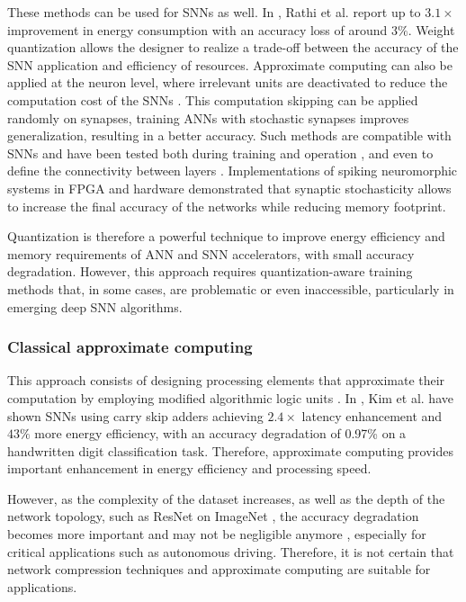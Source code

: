 These methods can be used for SNNs as well. In \cite{rathi2018stdp}, Rathi et al. report up to $3.1\times$ improvement in energy consumption with an accuracy loss of around $3\%$. Weight quantization allows the designer to realize a trade-off between the accuracy of the SNN application and efficiency of resources. Approximate computing can also be applied at the neuron level, where irrelevant units are deactivated to reduce the computation cost of the SNNs \cite{sen2017approximate}. This computation skipping can be applied randomly on synapses, training ANNs with stochastic synapses improves generalization, resulting in a better accuracy\cite{srivastava2014dropout, wan2013regularization}. Such methods are compatible with SNNs and have been tested both during training \cite{neftci2016stochastic, srinivasan2016magnetic} and operation \cite{buesing2011neural}, and even to define the connectivity between layers \cite{bellec2017deep, chen20184096}. Implementations of spiking neuromorphic systems in FPGA \cite{sheik2016synaptic} and hardware \cite{jerry2017ultra} demonstrated that synaptic stochasticity allows to increase the final accuracy of the networks while reducing memory footprint.

Quantization is therefore a powerful technique to improve energy efficiency and memory requirements of ANN and SNN accelerators, with small accuracy degradation. However, this approach requires quantization-aware training methods that, in some cases, are problematic or even inaccessible, particularly in emerging deep SNN algorithms\cite{zhang2018survey}.

\subsubsection{Classical approximate computing}
This approach consists of designing processing elements that approximate their computation by employing modified algorithmic logic units \cite{han2013approximate}. In \cite{kim2013energy}, Kim et al. have shown SNNs using carry skip adders achieving $2.4\times$ latency enhancement and $43\%$ more energy efficiency, with an accuracy degradation of 0.97\% on a handwritten digit classification task. Therefore, approximate computing provides important enhancement in energy efficiency and processing speed.

However, as the complexity of the dataset increases, as well as the depth of the network topology, such as ResNet \cite{he2016deep} on ImageNet \cite{russakovsky2015imagenet}, the accuracy degradation becomes more important and may not be negligible anymore \cite{rastegari2016xnor}, especially for critical applications such as autonomous driving. Therefore, it is not certain that network compression techniques and approximate computing are suitable for  applications.

